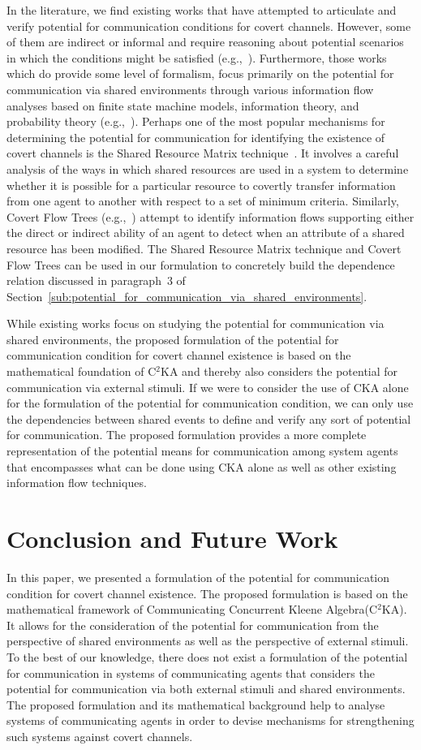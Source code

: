\documentclass[copyright,creativecommons]{eptcs}
\makeatletter
\newcommand{\eg}{\textrm{e.g.,}\@\xspace}
\newcommand{\PFC}{potential for communication\@\xspace}
\newcommand{\socas}{systems of communicating agents\@\xspace}
\newcommand{\CKAabbrv}{CKA\@\xspace}
\newcommand{\CCKA}{Communicating Concurrent Kleene Algebra\@\xspace}
\newcommand{\CCKAabbrv}{C$^2$KA\@\xspace}
\makeatother
\begin{document}
In the literature, we find existing works that have attempted to articulate and verify potential for communication conditions for covert channels. However, some of them are indirect or informal and require reasoning about potential scenarios in which the conditions might be satisfied (\eg~\cite{Shieh1999aa}). Furthermore, those works which do provide some level of formalism, focus primarily on the potential for communication via shared environments through various information flow analyses based on finite state machine models, information theory, and probability theory (\eg~\cite{Gray1991aa,Johnson2010aa,Millen1989aa,Wang2005aa}). Perhaps one of the most popular mechanisms for determining the \PFC for identifying the existence of covert channels is the Shared Resource Matrix technique~\cite{Kemmerer1983aa}. It involves a careful analysis of the ways in which shared resources are used in a system to determine whether it is possible for a particular resource to covertly transfer information from one agent to another with respect to a set of minimum criteria. Similarly, Covert Flow Trees (\eg~\cite{Kemmerer1991aa}) attempt to identify information flows supporting either the direct or indirect ability of an agent to detect when an attribute of a shared resource has been modified. The Shared Resource Matrix technique and Covert Flow Trees can be used in our formulation to concretely build the dependence relation discussed in paragraph~$3$ of Section~\ref{sub:potential_for_communication_via_shared_environments}.

While existing works focus on studying the potential for communication via shared environments, the proposed formulation of the \PFC condition for covert channel existence is based on the mathematical foundation of \CCKAabbrv and thereby also considers the potential for communication via external stimuli. If we were to consider the use of \CKAabbrv alone for the formulation of the \PFC condition, we can only use the dependencies between shared events to define and verify any sort of \PFC. The proposed formulation provides a more complete representation of the potential means for communication among system agents that encompasses what can be done using \CKAabbrv alone as well as other existing information flow techniques.  

\vspace{-0.15in}
\section{Conclusion and Future Work} 
\label{sec:conclusion_and_future_work}
\vspace{-0.1in}
In this paper, we presented a formulation of the \PFC condition for covert channel existence. The proposed formulation is based on the mathematical framework of \CCKA (\CCKAabbrv). It allows for the consideration of the \PFC from the perspective of shared environments as well as the perspective of external stimuli. To the best of our knowledge, there does not exist a formulation of the \PFC in \socas that considers the \PFC via both external stimuli and shared environments. The proposed formulation and its mathematical background help to analyse \socas in order to devise mechanisms for strengthening such systems against covert channels.
\end{document}
